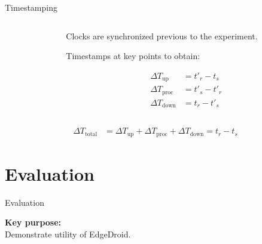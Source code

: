\documentclass[aspectratio=1610]{beamer}
\begin{document}
\begin{frame}{Timestamping}
    \begin{columns}[onlytextwidth]
        \begin{column}{.5\linewidth}
            \footnotesize%
            \raggedright%
            
        \end{column}%
        \begin{column}{.5\linewidth}
            Clocks are synchronized previous to the experiment.

            \vspace{\baselineskip}%
            Timestamps at key points to obtain:

            \begin{align}
                {\Delta}T_\text{up}   & = t'_{r} - t_{s}  \\
                {\Delta}T_\text{proc} & = t'_{s} - t'_{r} \\
                {\Delta}T_\text{down} & = t_{r} - t'_{s}
            \end{align}
        \end{column}%
    \end{columns}
    \begin{align}
        {\Delta}T_\text{total} & = {\Delta}T_\text{up} + {\Delta}T_\text{proc} + {\Delta}T_\text{down} = t_{r} - t_{s}
    \end{align}
\end{frame}

\section{Evaluation}
\begin{frame}{Evaluation}
    \begin{center}
        \Large%
        \textbf{Key purpose:}\\
        Demonstrate utility of EdgeDroid.\\
    \end{center}
\end{frame}
\end{document}

